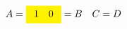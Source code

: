 \documentclass{article}
\begin{document}
\[ \begin{alignedat}{2}
A=\colorbox{yellow}{$\begin{array}{cc}1 &0\end{array}$}&=B &\quad C&=D
\end{alignedat} \]
\end{document}

